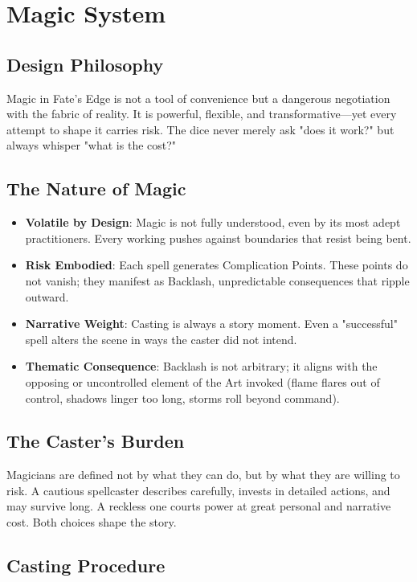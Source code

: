 \chapter{Magic System}

\section{Design Philosophy}

Magic in Fate's Edge is not a tool of convenience but a dangerous negotiation with the fabric of reality. It is powerful, flexible, and transformative---yet every attempt to shape it carries risk. The dice never merely ask "does it work?" but always whisper "what is the cost?"

\section{The Nature of Magic}

\begin{itemize}
\item \textbf{Volatile by Design}: Magic is not fully understood, even by its most adept practitioners. Every working pushes against boundaries that resist being bent.
\item \textbf{Risk Embodied}: Each spell generates Complication Points. These points do not vanish; they manifest as Backlash, unpredictable consequences that ripple outward.
\item \textbf{Narrative Weight}: Casting is always a story moment. Even a "successful" spell alters the scene in ways the caster did not intend.
\item \textbf{Thematic Consequence}: Backlash is not arbitrary; it aligns with the opposing or uncontrolled element of the Art invoked (flame flares out of control, shadows linger too long, storms roll beyond command).
\end{itemize}

\section{The Caster's Burden}

Magicians are defined not by what they can do, but by what they are willing to risk. A cautious spellcaster describes carefully, invests in detailed actions, and may survive long. A reckless one courts power at great personal and narrative cost. Both choices shape the story.

\section{Casting Procedure}


